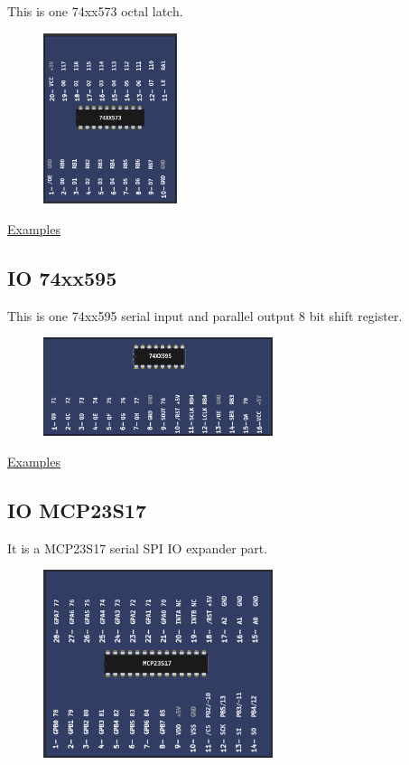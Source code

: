 This is one 74xx573 octal latch.

\begin{figure}[H]
\center
\includegraphics[width=0.35\textwidth]{img/part_74xx573.png} 
\end{figure} 

\href{https://lcgamboa.github.io/picsimlab_examples/parts_IO_74xx573.html}{Examples} 

\subsection{IO 74xx595}

This is one 74xx595 serial input and parallel output 8 bit shift register.

\begin{figure}[H]
\center
\includegraphics[width=0.6\textwidth]{img/part_74xx595.png} 
\end{figure} 

\href{https://lcgamboa.github.io/picsimlab_examples/parts_IO_74xx595.html}{Examples}

\subsection{IO MCP23S17}

It is a MCP23S17 serial SPI IO expander part.

\begin{figure}[H]
\center
\includegraphics[width=0.6\textwidth]{img/part_MCP23S17.png} 
\end{figure} 

